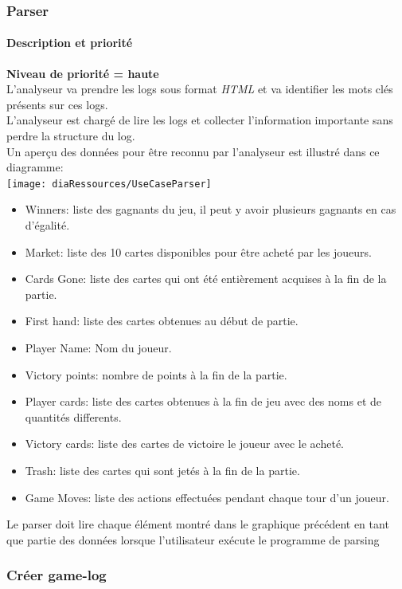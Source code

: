 \subsubsection{Parser}

\paragraph*{Description et priorité}
\textbf{Niveau de priorité = haute}\\
L'analyseur va prendre les logs sous format \textit{HTML} et va identifier les mots clés présents sur ces logs.\\
L'analyseur est chargé de lire les logs et collecter l'information importante sans perdre la structure du log.\\
Un aperçu des données pour être reconnu par l'analyseur est illustré dans ce diagramme:\\
\texttt{[image: diaRessources/UseCaseParser]}

\begin{itemize}
\item Winners: liste des gagnants du jeu, il peut y avoir plusieurs gagnants en cas d'égalité.
\item Market: liste des 10 cartes disponibles pour être acheté par les joueurs.
\item Cards Gone: liste des cartes qui ont été entièrement acquises à la fin de la partie.
\item First hand: liste des cartes obtenues au début de partie.%
\item Player Name: Nom du joueur.
\item Victory points: nombre de points à la fin de la partie.
\item Player cards: liste des cartes obtenues à la fin de jeu avec des noms et de quantités differents.
\item Victory cards: liste des cartes de victoire le joueur avec le acheté.
\item Trash: liste des cartes qui sont jetés à la fin de la partie.
\item Game Moves: liste des actions effectuées pendant chaque tour d'un joueur.
\end{itemize}
Le parser doit lire chaque élément montré dans le graphique précédent en tant que partie des données lorsque l'utilisateur exécute le programme de parsing\\

\subsubsection{Créer game-log}
